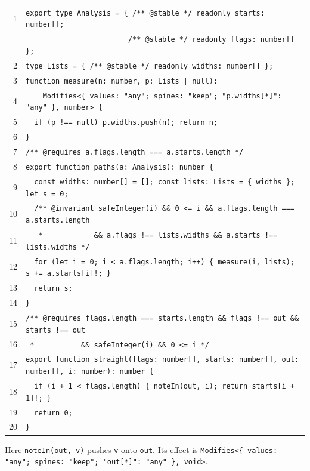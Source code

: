 \documentclass[10pt,a4paper]{article}
\theoremstyle{definition}
\theoremstyle{remark}
\newcommand{\code}[1]{\texttt{#1}}
\begin{document}
{\footnotesize
\begin{tabular}{@{}r@{\hspace{1em}}l@{}}
1 & \code{export type Analysis = \{ /** @stable */ readonly starts: number[];} \\
  & \code{~~~~~~~~~~~~~~~~~~~~~~~~/** @stable */ readonly flags: number[] \};} \\
2 & \code{type Lists = \{ /** @stable */ readonly widths: number[] \};} \\
3 & \code{function measure(n: number, p: Lists | null):} \\
4 & \code{~~~~Modifies<\{ values: "any"; spines: "keep"; "p.widths[*]": "any" \}, number> \{} \\
5 & \code{~~if (p !== null) p.widths.push(n); return n;} \\
6 & \code{\}} \\
7 & \code{/** @requires a.flags.length === a.starts.length */} \\
8 & \code{export function paths(a: Analysis): number \{} \\
9 & \code{~~const widths: number[] = []; const lists: Lists = \{ widths \}; let s = 0;} \\
10 & \code{~~/** @invariant safeInteger(i) \&\& 0 <= i \&\& a.flags.length === a.starts.length} \\
11 & \code{~~~*~~~~~~~~~~~~\&\& a.flags !== lists.widths \&\& a.starts !== lists.widths */} \\
12 & \code{~~for (let i = 0; i < a.flags.length; i++) \{ measure(i, lists); s += a.starts[i]!; \}} \\
13 & \code{~~return s;} \\
14 & \code{\}} \\
15 & \code{/** @requires flags.length === starts.length \&\& flags !== out \&\& starts !== out} \\
16 & \code{~*~~~~~~~~~~~\&\& safeInteger(i) \&\& 0 <= i */} \\
17 & \code{export function straight(flags: number[], starts: number[], out: number[], i: number): number \{} \\
18 & \code{~~if (i + 1 < flags.length) \{ noteIn(out, i); return starts[i + 1]!; \}} \\
19 & \code{~~return 0;} \\
20 & \code{\}} \\
\end{tabular}}

\noindent
Here \code{noteIn(out, v)} pushes \code{v} onto \code{out}. Its effect
is
\code{Modifies<\{ values: "any"; spines: "keep"; "out[*]": "any" \}, void>}.
\end{document}
